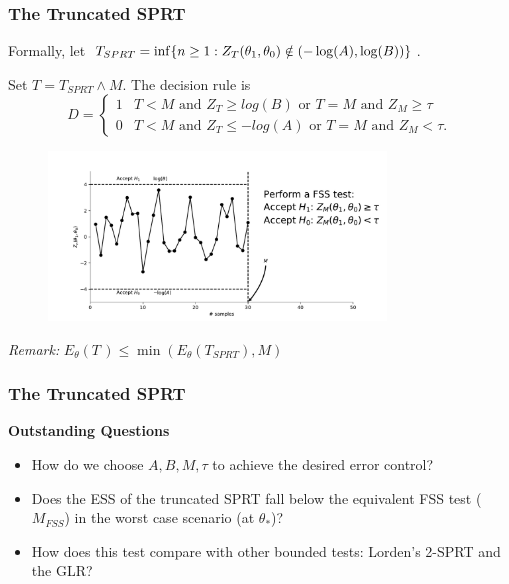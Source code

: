 \documentclass[10pt]{beamer}
\begin{document}
\begin{frame}
\frametitle{The Truncated SPRT}

Formally, let $T_{SPRT} = \inf\{n \geq 1 : Z_{T}(\theta_1, \theta_0) \notin (-\log(A), \log(B)) \}$.

Set $T = T_{SPRT} \wedge M$. The decision rule is
\[
D =
\begin{cases}
1  & T < M \text{ and } Z_T \geq log(B) \text{ or } T = M \text{ and } Z_M \geq \tau \\
0  & T < M \text{ and } Z_T \leq -log(A) \text{ or } T = M \text{ and } Z_M < \tau .
\end{cases}
\]

\begin{figure}
\centering
\includegraphics[height=0.45\textheight, width=0.8\textwidth]{images/truncated_sprt}
\end{figure}

\textit{Remark:} $E_{\theta}(T\,) \leq \min(E_{\theta}(T_{SPRT}), M)$
\end{frame}

\begin{frame}
\frametitle{The Truncated SPRT}
\textbf{Outstanding Questions}

\begin{itemize}
\item How do we choose $A, B, M, \tau$ to achieve the desired error control?
\item Does the ESS of the truncated SPRT fall below the equivalent FSS test ($M_{FSS}$) in the worst case scenario (at $\theta_{*}$)?
\item How does this test compare with other bounded tests: Lorden's 2-SPRT and the GLR?
\end{itemize}

\end{frame}
\end{document}

